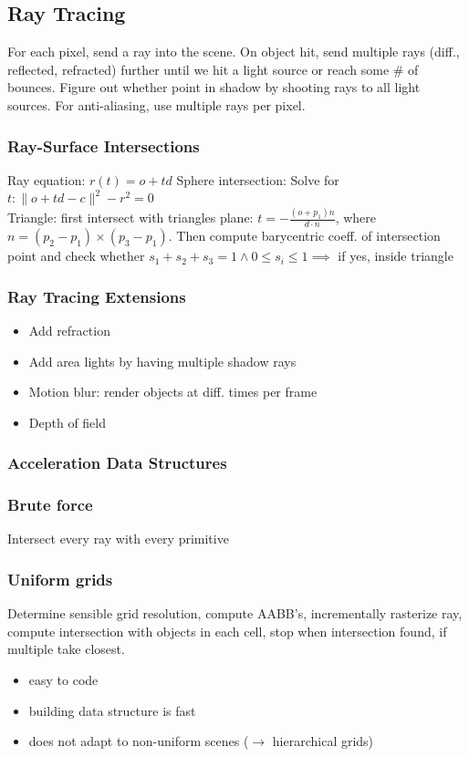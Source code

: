 \documentclass[a4paper,10pt]{article}
\newcommand*\good{\item[\textcolor{goodgreen}{\(\bm{+}\)}]}
\newcommand*\bad{\item[\textcolor{badred}{\(\bm{-}\)}]}
\begin{document}
\subsection{Ray Tracing}
For each pixel, send a ray into the scene. On object hit, send multiple rays (diff., reflected, refracted) further until we hit a light source or reach some \# of bounces. Figure out whether point in shadow by shooting rays to all light sources. For anti-aliasing, use multiple rays per pixel.

\subsubsection{Ray-Surface Intersections} Ray equation: \( r(t) = o + td \)
Sphere intersection: Solve for \( t: \lVert o + td - c \rVert ^2 - r^2 = 0 \) \\
Triangle: first intersect with triangles plane: \( t = -\frac{(o+p_{1})n}{d\cdot n} \), where \( n = (p_{2}-p_{1})\times(p_{3}-p_{1}) \).
Then compute barycentric coeff. of intersection point and check whether \( s_{1}+s_{2}+s_{3} = 1 \land 0 \le s_i \le 1 \implies \) if yes, inside triangle

\subsubsection{Ray Tracing Extensions}
\begin{itemize}
    \item Add refraction
    \item Add area lights by having multiple shadow rays
    \item Motion blur: render objects at diff. times per frame
    \item Depth of field
\end{itemize}

\subsubsection{Acceleration Data Structures}
\smallskip
\subsubsection{Brute force} Intersect every ray with every primitive
\subsubsection{Uniform grids} Determine sensible grid resolution, compute AABB's, incrementally rasterize ray, compute intersection with objects in each cell, stop when intersection found, if multiple take closest.
\begin{itemize}
    \good easy to code
    \good building data structure is fast
    \bad does not adapt to non-uniform scenes (\( \to  \) hierarchical grids)
\end{itemize}
\end{document}
